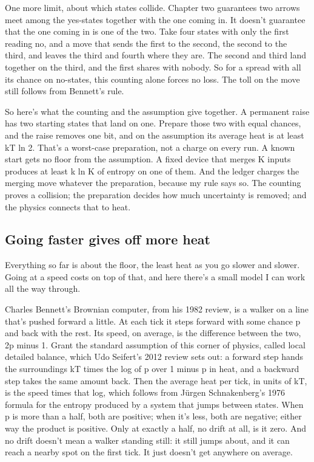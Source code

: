 \documentclass[11pt,twoside]{article}
\theoremstyle{thielethm}
\theoremstyle{thieledef}
\theoremstyle{thieledef}
\theoremstyle{thieledef}
\theoremstyle{thielethm}
\theoremstyle{thieleobs}
\theoremstyle{thielethm}
\begin{document}
One more limit, about which states collide. Chapter two guarantees two arrows meet among the yes-states together with the one coming in. It doesn't guarantee that the one coming in is one of the two. Take four states with only the first reading no, and a move that sends the first to the second, the second to the third, and leaves the third and fourth where they are. The second and third land together on the third, and the first shares with nobody. So for a spread with all its chance on no-states, this counting alone forces no loss. The toll on the move still follows from Bennett's rule.

So here's what the counting and the assumption give together. A permanent raise has two starting states that land on one. Prepare those two with equal chances, and the raise removes one bit, and on the assumption its average heat is at least kT ln 2. That's a worst-case preparation, not a charge on every run. A known start gets no floor from the assumption. A fixed device that merges K inputs produces at least k ln K of entropy on one of them. And the ledger charges the merging move whatever the preparation, because my rule says so. The counting proves a collision; the preparation decides how much uncertainty is removed; and the physics connects that to heat.

\subsection{Going faster gives off more heat}

Everything so far is about the floor, the least heat as you go slower and slower. Going at a speed costs on top of that, and here there's a small model I can work all the way through.

Charles Bennett's Brownian computer, from his 1982 review, is a walker on a line that's pushed forward a little. At each tick it steps forward with some chance p and back with the rest. Its speed, on average, is the difference between the two, 2p minus 1. Grant the standard assumption of this corner of physics, called local detailed balance, which Udo Seifert's 2012 review sets out: a forward step hands the surroundings kT times the log of p over 1 minus p in heat, and a backward step takes the same amount back. Then the average heat per tick, in units of kT, is the speed times that log, which follows from Jürgen Schnakenberg's 1976 formula for the entropy produced by a system that jumps between states. When p is more than a half, both are positive; when it's less, both are negative; either way the product is positive. Only at exactly a half, no drift at all, is it zero. And no drift doesn't mean a walker standing still: it still jumps about, and it can reach a nearby spot on the first tick. It just doesn't get anywhere on average.
\end{document}
